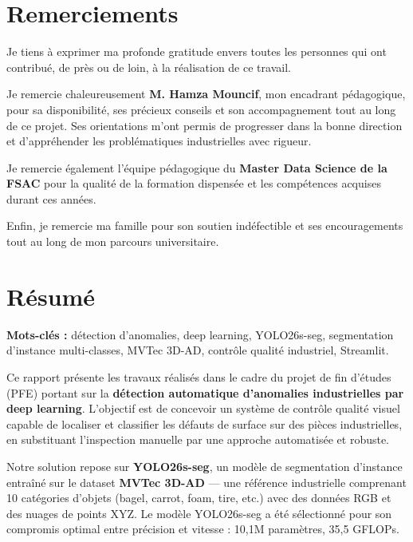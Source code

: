 \documentclass[12pt, a4paper]{report}
\begin{document}
\chapter*{Remerciements}

Je tiens à exprimer ma profonde gratitude envers toutes les personnes qui ont contribué, de près ou de loin, à la réalisation de ce travail.

Je remercie chaleureusement \textbf{M. Hamza Mouncif}, mon encadrant pédagogique, pour sa disponibilité, ses précieux conseils et son accompagnement tout au long de ce projet. Ses orientations m'ont permis de progresser dans la bonne direction et d'appréhender les problématiques industrielles avec rigueur.

Je remercie également l'équipe pédagogique du \textbf{Master Data Science de la FSAC} pour la qualité de la formation dispensée et les compétences acquises durant ces années.

Enfin, je remercie ma famille pour son soutien indéfectible et ses encouragements tout au long de mon parcours universitaire.

\newpage

\chapter*{Résumé}

\noindent\textbf{Mots-clés :} détection d'anomalies, deep learning, YOLO26s-seg, segmentation d'instance multi-classes, MVTec 3D-AD, contrôle qualité industriel, Streamlit.

\vspace{0.5cm}

Ce rapport présente les travaux réalisés dans le cadre du projet de fin d'études (PFE) portant sur la \textbf{détection automatique d'anomalies industrielles par deep learning}. L'objectif est de concevoir un système de contrôle qualité visuel capable de localiser et classifier les défauts de surface sur des pièces industrielles, en substituant l'inspection manuelle par une approche automatisée et robuste.

Notre solution repose sur \textbf{YOLO26s-seg}, un modèle de segmentation d'instance entraîné sur le dataset \textbf{MVTec 3D-AD} — une référence industrielle comprenant 10 catégories d'objets (bagel, carrot, foam, tire, etc.) avec des données RGB et des nuages de points XYZ. Le modèle YOLO26s-seg a été sélectionné pour son compromis optimal entre précision et vitesse : 10,1M paramètres, 35,5 GFLOPs.
\end{document}
